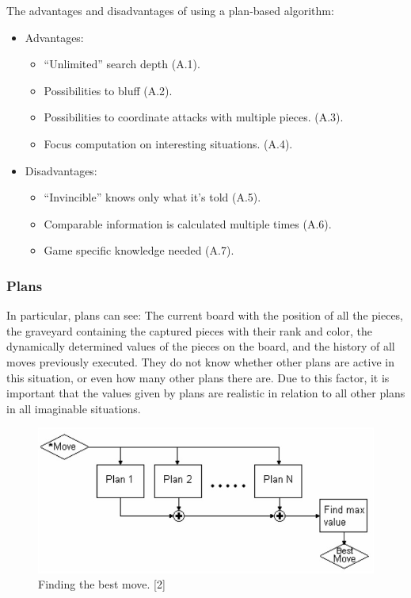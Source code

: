 \documentclass{article}
\begin{document}
The advantages and disadvantages of using a plan-based algorithm:

\begin{itemize}
  \item Advantages:
  \begin{itemize}
    \item “Unlimited” search depth (A.1).
    \item Possibilities to bluff (A.2).
    \item Possibilities to coordinate attacks with multiple pieces. (A.3).
    \item Focus computation on interesting situations. (A.4).
  \end{itemize}
  \item Disadvantages:
  \begin{itemize}
    \item “Invincible” knows only what it’s told (A.5).
    \item Comparable information is calculated multiple times (A.6).
    \item Game specific knowledge needed (A.7).
  \end{itemize}
\end{itemize}

\subsubsection{Plans}

In particular, plans can see: The current board with the position of all the pieces, the graveyard containing the captured pieces with their rank and color, 
the dynamically determined values of the pieces on the board, and the history of all moves previously executed. 
They do not know whether other plans are active in this situation, or even how many other plans there are. 
Due to this factor, it is important that the values given by plans are realistic in relation to all other plans in all imaginable situations.

\begin{figure}
  \includegraphics[scale=0.5]{assets/plan.jpg}
  \caption{Finding the best move. [2]}
  \label{fig:plans1}
\end{figure}
\end{document}
